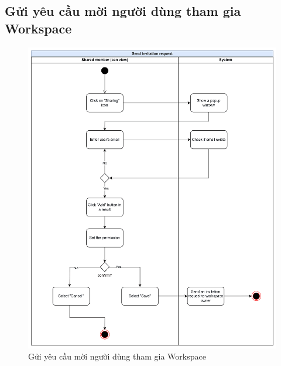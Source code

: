 \subsection{Gửi yêu cầu mời người dùng tham gia Workspace}
    \begin{figure}[H]
        \centering
        \includegraphics[width=\linewidth]{Content/Phân tích và thiết kế hệ thống/documents/Sơ đồ hoạt động/images/sendInvitationRequest.png}
        \vspace{0.5cm}
        \caption{Gửi yêu cầu mời người dùng tham gia Workspace}
        \label{fig:Gửi yêu cầu mời người dùng tham gia Workspace}
    \end{figure}